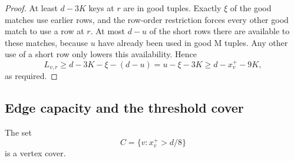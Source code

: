 \begin{proof}
At least \(d-3K\) keys at \(r\) are in good tuples.
Exactly \(\xi\) of the good matches use earlier rows, and the
row-order restriction forces every other good match to use a row
at \(r\).  At most \(d-u\) of the short rows there are available
to these matches, because \(u\) have already been used in good
\(\mathrm M\) tuples.  Any other use of a short row only lowers
this availability.  Hence
\[
 L_{v,r}\ge d-3K-\xi-(d-u)
          =u-\xi-3K
          \ge d-x_v^+-9K,
\]
as required.
\end{proof}

\subsection{Edge capacity and the threshold cover}

\begin{lemma}\label{lem:edge-cover}
The set
\[
 C=\{v:x_v^+>d/8\}
\]
is a vertex cover.
\end{lemma}

